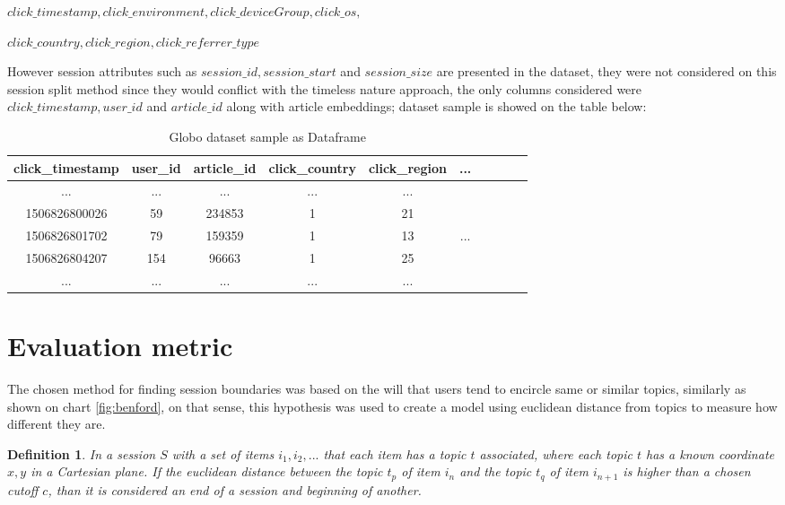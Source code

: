 \documentclass[ecp,tc,english]{iiufrgs}
\newtheorem{definition}{Definition}
\begin{document}
    \(click\_timestamp, click\_environment, click\_deviceGroup, click\_os, \)
    
    \(click\_country, click\_region, click\_referrer\_type \)

    However session attributes such as \(session\_id, session\_start\) and \(session\_size\) are presented in the dataset, they were not considered on this session split method since they would conflict with the timeless nature approach, the only columns considered were \(click\_timestamp, user\_id\) and \(article\_id\) along with article embeddings; dataset sample is showed on the table below:
    
    \begin{table}[H]
        \centering
        \begin{tabular}{ |c|c|c|c|c|c|c|c|c|c| } 
            \hline
            click\_timestamp & user\_id & article\_id & click\_country & click\_region & ... \\
            \hline 
            ... & ...  & ...  & ...  & ... & \\
            1506826800026 & 59 & 234853 & 1 & 21 & \\ 
            1506826801702 & 79 & 159359 & 1 & 13 & ...\\ 
            1506826804207 & 154 & 96663 & 1 & 25 & \\ 
            ... & ...  & ...  & ...  & ... & \\
            \hline
        \end{tabular}
        \caption{Globo dataset sample as Dataframe}
        \label{tab:globo_dataset_sample}
    \end{table}


    \section{Evaluation metric} \label{euclidean_distance_heuristic}
    The chosen method for finding session boundaries was based on the will that users tend to encircle same or similar topics, similarly as shown on chart \ref{fig:benford}, on that sense, this hypothesis was used to create a model using euclidean distance from topics to measure how different they are.
    
    \begin{definition}
    In a session \(S\) with a set of items \(i_{1}, i_{2}, ...\) that each item has a \textit{topic} \(t\) associated, where each \textit{topic} \(t\) has a known coordinate \(x, y\) in a Cartesian plane.
    If the euclidean distance between the topic \(t_{p}\) of item \(i_{n}\) and the topic \(t_{q}\) of item \(i_{n+1}\) is higher than a chosen cutoff \(c\), than it is considered an end of a session and beginning of another.
    \label{euclidean_distance_threshold_definition}
    \end{definition}
\end{document}
